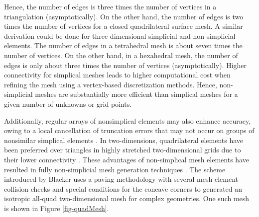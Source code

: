 Hence, the number of edges is three times the number of vertices in a triangulation (asymptotically). On the other hand, the number of edges is two times the number of vertices for a closed quadrilateral surface mesh. A similar derivation could be done for three-dimensional simplicial and non-simplicial elements. The number of edges in a tetrahedral mesh is about seven times the number of vertices. On the other hand, in a hexahedral mesh, the number of edges is only about three times the number of vertices (asymptotically). Higher connectivity for simplical meshes leads to higher computational cost when refining the mesh using a vertex-based discretization methods. Hence, non-simplicial meshes are substantially more efficient than simplical meshes for a given number of unknowns or grid points.

Additionally, regular arrays of nonsimplical elements may also enhance accuracy, owing to a local cancellation of truncation errors that may not occur on groups of nonsimilar simplical elements \cite{mavriplis1997unstructured}. In two-dimensions, quadrilateral elements have been preferred over triangles in highly stretched two-dimensional grids due to their lower connectivity \cite{aftosmis1994accuracy}. These advantages of non-simplical mesh elements have resulted in fully non-simplicial mesh generation techniques \cite{blacker1991paving, zhu1991new}. The scheme introduced by Blacker \etal uses a paving methodology with several mesh element collision checks and special conditions for the concave corners to generated an isotropic all-quad two-dimensional mesh for complex geometries. One such mesh is shown in Figure \ref{fig-quadMesh}.

